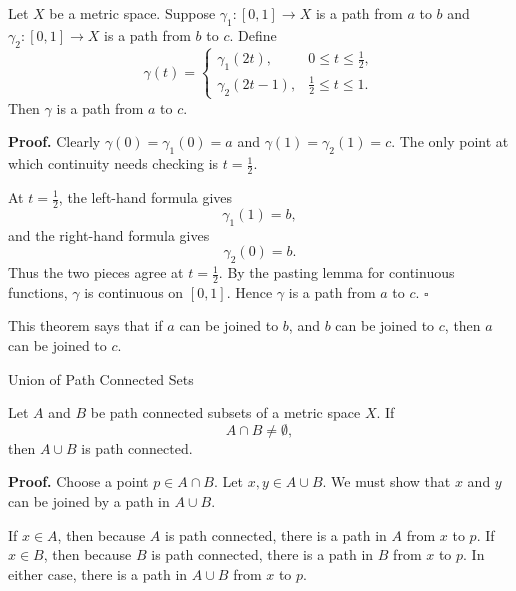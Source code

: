 \documentclass[12pt, a4paper]{article}
\begin{document}
\vspace{10pt}

\begin{theorem}
Let $X$ be a metric space. Suppose $\gamma_1:[0,1]\to X$ is a path from $a$ to $b$ and $\gamma_2:[0,1]\to X$ is a path from $b$ to $c$. Define
\[
\gamma(t)=
\begin{cases}
\gamma_1(2t), & 0\leq t\leq \frac12,\\[4pt]
\gamma_2(2t-1), & \frac12\leq t\leq 1.
\end{cases}
\]
Then $\gamma$ is a path from $a$ to $c$.
\end{theorem}

\textbf{Proof.}
Clearly $\gamma(0)=\gamma_1(0)=a$ and $\gamma(1)=\gamma_2(1)=c$. The only point at which continuity needs checking is $t=\frac12$.

At $t=\frac12$, the left-hand formula gives
\[
    \gamma_1(1)=b,
\]
and the right-hand formula gives
\[
    \gamma_2(0)=b.
\]
Thus the two pieces agree at $t=\frac12$. By the pasting lemma for continuous functions, $\gamma$ is continuous on $[0,1]$. Hence $\gamma$ is a path from $a$ to $c$. \hfill $\square$

\vspace{30pt}

\begin{problem}[Remark]
This theorem says that if $a$ can be joined to $b$, and $b$ can be joined to $c$, then $a$ can be joined to $c$.
\end{problem}

\clearpage

\begin{heading}
    Union of Path Connected Sets
\end{heading}

\vspace{10pt}

\begin{theorem}
Let $A$ and $B$ be path connected subsets of a metric space $X$. If
\[
    A\cap B\neq\emptyset,
\]
then $A\cup B$ is path connected.
\end{theorem}

\textbf{Proof.}
Choose a point $p\in A\cap B$. Let $x,y\in A\cup B$. We must show that $x$ and $y$ can be joined by a path in $A\cup B$.

If $x\in A$, then because $A$ is path connected, there is a path in $A$ from $x$ to $p$. If $x\in B$, then because $B$ is path connected, there is a path in $B$ from $x$ to $p$. In either case, there is a path in $A\cup B$ from $x$ to $p$.
\end{document}
